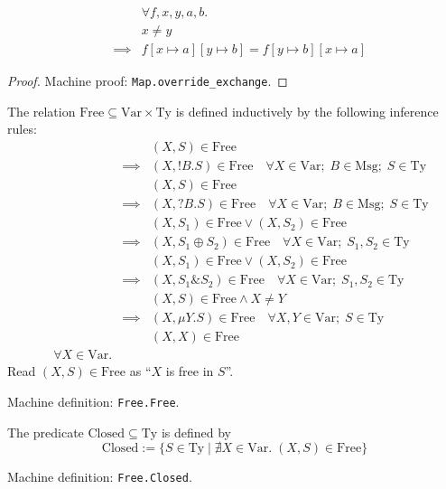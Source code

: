 \documentclass{llncs}
\newcommand*{\Msg}{\mathrm{Msg}}
\newcommand*{\Var}{\mathrm{Var}}
\newcommand*{\Ty}{\mathrm{Ty}}
\newcommand*{\Free}{\mathrm{Free}}
\newcommand*{\Closed}{\mathrm{Closed}}
\newcommand*{\send}{\mathord{!}}
\newcommand*{\recv}{\mathord{?}}
\newcommand*{\echoice}{\oplus}
\newcommand*{\ichoice}{\mathop{\&}}
\renewcommand*{\|}{\;|\;}
\newcommand*{\machdefc}[1]{Machine definition: \code{#1}.}
\newcommand*{\machproofc}[1]{Machine proof: \code{#1}.}
\newcommand*{\code}[1]{\texttt{#1}}
\begin{document}
\begin{lemma}
  \label{lemma:overriding_exchange}
  \begin{eqnarray*}
    &&         \forall f, x, y, a, b. \\
    &&         x \neq y \\
    &\implies& f[x \mapsto a][y \mapsto b] = f[y \mapsto b][x \mapsto a]
  \end{eqnarray*}

  \begin{proof}
    \machproofc{Map.override\_exchange}
  \end{proof}
\end{lemma}


\begin{definition}
  \label{def:free}
  The relation $\Free \subseteq \Var \times \Ty$ is defined inductively
  by the following inference rules:
  \begin{eqnarray*}
    && (X, S) \in \Free \\
    &\implies& (X, \send B.S) \in \Free
    \quad \forall X \in \Var;\; B \in \Msg;\; S \in \Ty \\
    && (X, S) \in \Free \\
    &\implies& (X, \recv B.S) \in \Free
    \quad \forall X \in \Var;\; B \in \Msg;\; S \in \Ty \\
    && (X, S_1) \in \Free \lor (X, S_2) \in \Free \\
    &\implies& (X, S_1 \echoice S_2) \in \Free
    \quad \forall X \in \Var;\; S_1, S_2 \in \Ty \\
    && (X, S_1) \in \Free \lor (X, S_2) \in \Free \\
    &\implies& (X, S_1 \ichoice S_2) \in \Free
    \quad \forall X \in \Var;\; S_1, S_2 \in \Ty \\
    && (X, S) \in \Free \land X \neq Y \\
    &\implies& (X, \mu Y.S) \in \Free
    \quad \forall X, Y \in \Var;\; S \in \Ty \\
    && (X, X) \in \Free \\
    \quad \forall X \in \Var.
  \end{eqnarray*}
  Read $(X, S) \in \Free$ as \enquote{$X$ is free in $S$}.

  \machdefc{Free.Free}
\end{definition}


\begin{definition}[Closedness]
  \label{def:closed}
  The predicate $\Closed \subseteq \Ty$ is defined by
  \begin{equation*}
    \Closed := \{ S \in \Ty \mid \nexists X \in \Var.\; (X, S) \in \Free \}
  \end{equation*}

  \machdefc{Free.Closed}
\end{definition}
\end{document}
